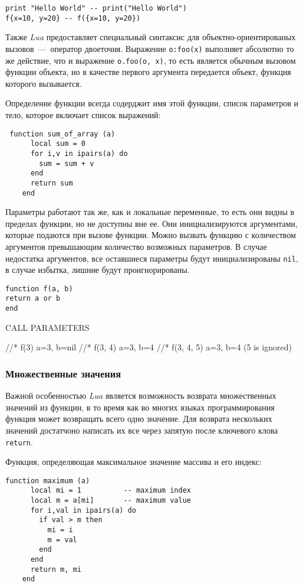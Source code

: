 \begin{lstlisting}
print "Hello World" -- print("Hello World")
f{x=10, y=20} -- f({x=10, y=20})
\end{lstlisting}

Также \emph{Lua} предоставляет специальный синтаксис для объектно-ориентированых вызовов~---~оператор двоеточия. Выражение \lstinline{o:foo(x)} выполняет абсолютно то же действие, что и выражение \lstinline{o.foo(o, x)}, то есть является обычным вызовом функции объекта, но в качестве первого аргумента передается объект, функция которого вызывается. 

Определение функции всегда содерджит имя этой функции, список параметров и тело, которое включает список выражений:

\begin{lstlisting}
 function sum_of_array (a)
      local sum = 0
      for i,v in ipairs(a) do
        sum = sum + v
      end
      return sum
    end
\end{lstlisting}

Параметры работают так же, как и локальные переменные, то есть они видны в пределах функции, но не доступны вне ее. Они инициализируются аргументами, которые подаются при вызове функции. Можно вызвать функцию с количеством аргументов превышающим количество возможных параметров. В случае недостатка аргументов, все оставшиеся параметры будут инициализированы \lstinline{nil}, в случае избытка, лишние будут проигнорированы.

\begin{lstlisting}
function f(a, b) 
return a or b 
end
\end{lstlisting}
CALL             PARAMETERS
       
//* f(3)             a=3, b=nil
//* f(3, 4)          a=3, b=4
//* f(3, 4, 5)       a=3, b=4   (5 is ignored)


\subsubsection{Множественные значения}
Важной особенностью \emph{Lua} является возможность возврата множественных значений из функции, в то время как во многих языках программирования функция может возвращать всего одно значение. Для возврата нескольких значений достатчоно написать их все через запятую после ключевого клова \lstinline{return}.


Функция, определяющая максимальное значение массива и его индекс:
\begin{lstlisting}
function maximum (a)
      local mi = 1          -- maximum index
      local m = a[mi]       -- maximum value
      for i,val in ipairs(a) do
        if val > m then
          mi = i
          m = val
        end
      end
      return m, mi
    end
\end{lstlisting}

